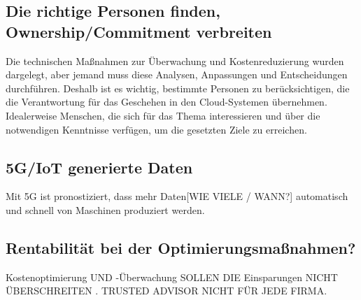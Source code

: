 \subsection*{Die richtige Personen finden, Ownership/Commitment verbreiten}
Die technischen Maßnahmen zur Überwachung und Kostenreduzierung wurden dargelegt, aber jemand muss diese Analysen, Anpassungen und Entscheidungen durchführen. 
Deshalb ist es wichtig, bestimmte Personen zu berücksichtigen, die die Verantwortung für das Geschehen in den Cloud-Systemen übernehmen. Idealerweise Menschen, die sich für das Thema interessieren und über die notwendigen Kenntnisse verfügen, um die gesetzten Ziele zu erreichen. 
\\
\subsection*{5G/IoT generierte Daten}
Mit 5G ist pronostiziert, dass mehr Daten[WIE VIELE / WANN?] automatisch und schnell von Maschinen produziert werden.
\\
\subsection*{Rentabilität bei der Optimierungsmaßnahmen?}
Kostenoptimierung UND -Überwachung SOLLEN DIE Einsparungen NICHT ÜBERSCHREITEN . 
TRUSTED ADVISOR NICHT FÜR JEDE FIRMA.


